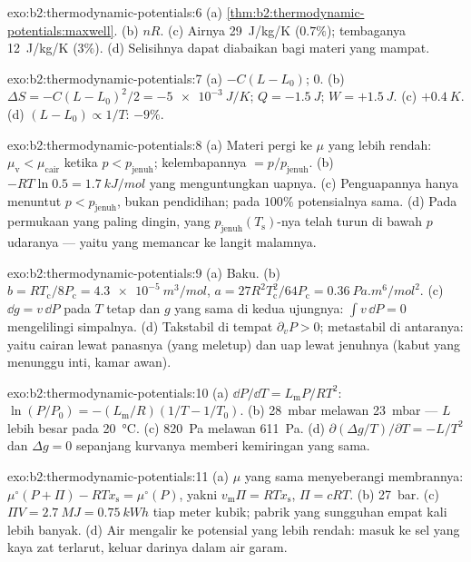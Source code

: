 \begin{solution}{exo:b2:thermodynamic-potentials:6}
(a) \cref{thm:b2:thermodynamic-potentials:maxwell}. (b) $nR$. (c) Airnya
\qty{29}{J/kg/K} ($0.7\%$); tembaganya \qty{12}{J/kg/K} ($3\%$). (d) Selisihnya
dapat diabaikan bagi materi yang mampat.
\end{solution}

\begin{solution}{exo:b2:thermodynamic-potentials:7}
(a) $-C(L - L_0)$; $0$. (b) $\Delta S = -C(L - L_0)^2/2 = \qty{-5e-3}{J/K}$; $Q =
\qty{-1.5}{J}$; $W = +\qty{1.5}{J}$. (c) $+\qty{0.4}{K}$. (d) $(L - L_0) \propto
1/T$: $-9\%$.
\end{solution}

\begin{solution}{exo:b2:thermodynamic-potentials:8}
(a) Materi pergi ke $\mu$ yang lebih rendah: $\mu_{\text{v}} < \mu_{\text{cair}}$ ketika $p <
p_{\text{jenuh}}$; kelembapannya $= p/p_{\text{jenuh}}$. (b) $-RT\ln 0.5 = \qty{1.7}{kJ/mol}$
yang menguntungkan uapnya. (c) Penguapannya hanya menuntut $p < p_{\text{jenuh}}$,
bukan pendidihan; pada $100\%$ potensialnya sama. (d) Pada permukaan yang paling
dingin, yang $p_{\text{jenuh}}(T_{\text{s}})$-nya telah turun di bawah $p$ udaranya
--- yaitu yang memancar ke langit malamnya.
\end{solution}

\begin{solution}{exo:b2:thermodynamic-potentials:9}
(a) Baku. (b) $b = RT_{\text{c}}/8P_{\text{c}} = \qty{4.3e-5}{m^3/mol}$, $a =
27R^2T_{\text{c}}^2/64P_{\text{c}} = \qty{0.36}{Pa.m^6/mol^2}$. (c) $\dd g = v\,\dd P$
pada $T$ tetap dan $g$ yang sama di kedua ujungnya: $\int v\,\dd P = 0$ mengelilingi
simpalnya. (d) Takstabil di tempat $\partial_vP > 0$; metastabil di antaranya: yaitu
cairan lewat panasnya (yang meletup) dan uap lewat jenuhnya (kabut yang
menunggu inti, kamar awan).
\end{solution}

\begin{solution}{exo:b2:thermodynamic-potentials:10}
(a) $\dd P/\dd T = L_{\text{m}}P/RT^2$: $\ln(P/P_0) = -(L_{\text{m}}/R)(1/T - 1/T_0)$.
(b) \qty{28}{mbar} melawan \qty{23}{mbar} --- $L$ lebih besar pada \qty{20}{\celsius}.
(c) \qty{820}{Pa} melawan \qty{611}{Pa}. (d) $\partial(\Delta g/T)/\partial T = -L/T^2$
dan $\Delta g = 0$ sepanjang kurvanya memberi kemiringan yang sama.
\end{solution}

\begin{solution}{exo:b2:thermodynamic-potentials:11}
(a) $\mu$ yang sama menyeberangi membrannya: $\mu^\circ(P + \Pi) - RTx_{\text{s}} =
\mu^\circ(P)$, yakni $v_{\text{m}}\Pi = RTx_{\text{s}}$, $\Pi = cRT$. (b) \qty{27}{bar}.
(c) $\Pi V = \qty{2.7}{MJ} = \qty{0.75}{kWh}$ tiap meter kubik; pabrik yang sungguhan
empat kali lebih banyak. (d) Air mengalir ke potensial yang lebih rendah: masuk ke
sel yang kaya zat terlarut, keluar darinya dalam air garam.
\end{solution}

